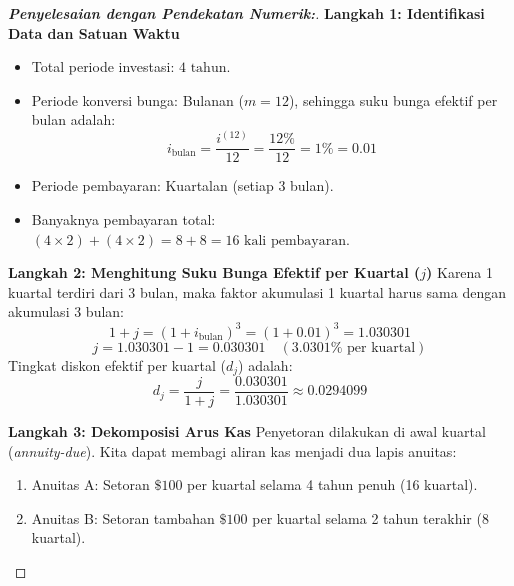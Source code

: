 \documentclass[11pt,a4paper]{article}
\begin{document}
\begin{proof}[\textbf{Penyelesaian dengan Pendekatan Numerik:}]
\textbf{Langkah 1: Identifikasi Data dan Satuan Waktu}
\begin{itemize}
    \item Total periode investasi: $4\text{ tahun}$.
    \item Periode konversi bunga: Bulanan ($m=12$), sehingga suku bunga efektif per bulan adalah:
    \begin{equation*}
        i_{\text{bulan}} = \frac{i^{(12)}}{12} = \frac{12\%}{12} = 1\% = 0.01
    \end{equation*}
    \item Periode pembayaran: Kuartalan (setiap 3 bulan).
    \item Banyaknya pembayaran total: $(4 \times 2) + (4 \times 2) = 8 + 8 = 16\text{ kali pembayaran}$.
\end{itemize}

\textbf{Langkah 2: Menghitung Suku Bunga Efektif per Kuartal ($j$)}
Karena 1 kuartal terdiri dari 3 bulan, maka faktor akumulasi 1 kuartal harus sama dengan akumulasi 3 bulan:
\begin{equation*}
    1 + j = (1 + i_{\text{bulan}})^3 = (1 + 0.01)^3 = 1.030301
\end{equation*}
\begin{equation*}
    j = 1.030301 - 1 = 0.030301 \quad (3.0301\%\text{ per kuartal})
\end{equation*}
Tingkat diskon efektif per kuartal ($d_j$) adalah:
\begin{equation*}
    d_j = \frac{j}{1+j} = \frac{0.030301}{1.030301} \approx 0.0294099
\end{equation*}

\textbf{Langkah 3: Dekomposisi Arus Kas}
Penyetoran dilakukan di awal kuartal (\textit{annuity-due}). Kita dapat membagi aliran kas menjadi dua lapis anuitas:
\begin{enumerate}
    \item Anuitas A: Setoran $\$100$ per kuartal selama 4 tahun penuh (16 kuartal).
    \item Anuitas B: Setoran tambahan $\$100$ per kuartal selama 2 tahun terakhir (8 kuartal).
\end{enumerate}

\begin{center}
\end{center}
\end{proof}
\end{document}
